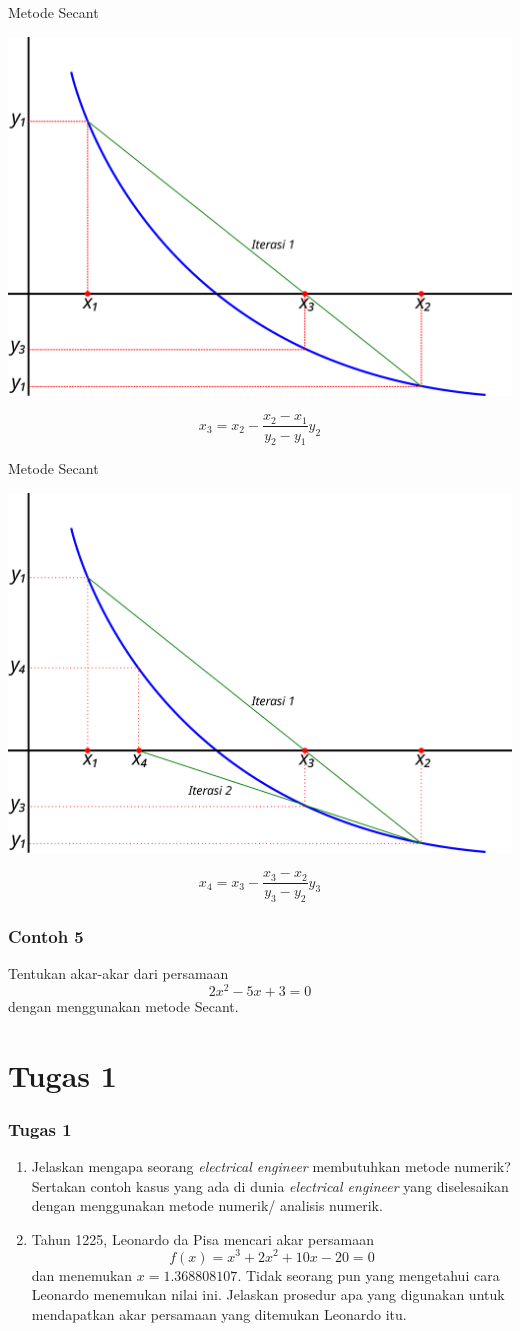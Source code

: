 \documentclass[pdflatex,compress,mathserif]{beamer}
\begin{document}
\begin{frame}{Metode Secant}
	\begin{center}
		\includegraphics[width=0.7\linewidth]{img/04}
	\end{center}
	$$ x_3 = x_{2} - \frac{x_{2}-x_{1}}{y_{2}-y_{1}}y_{2} $$
\end{frame}

\begin{frame}{Metode Secant}
	\begin{center}
		\includegraphics[width=0.7\linewidth]{img/05}
	\end{center}
	$$ x_4 = x_{3} - \frac{x_{3}-x_{2}}{y_{3}-y_{2}}y_{3} $$
\end{frame}

\begin{frame}
	\frametitle{Contoh 5}
	Tentukan akar-akar dari persamaan $$ 2x^2 - 5x + 3 = 0 $$ dengan menggunakan metode Secant.
\end{frame}

\section{Tugas 1}

\begin{frame}
	\frametitle{Tugas 1}
	\begin{enumerate}
		\item Jelaskan mengapa seorang \textit{electrical engineer} membutuhkan metode numerik? Sertakan contoh kasus yang ada di dunia \textit{electrical engineer} yang diselesaikan dengan menggunakan metode numerik/ analisis numerik.
		\item Tahun 1225, Leonardo da Pisa mencari akar persamaan
		$$ f(x) = x^3 + 2x^2 + 10x - 20 = 0 $$
		dan menemukan $ x = 1.368808107 $. Tidak seorang pun yang mengetahui cara
		Leonardo menemukan nilai ini. Jelaskan prosedur apa yang digunakan untuk mendapatkan  akar persamaan yang ditemukan Leonardo itu.
	\end{enumerate}
\end{frame}
\end{document}
